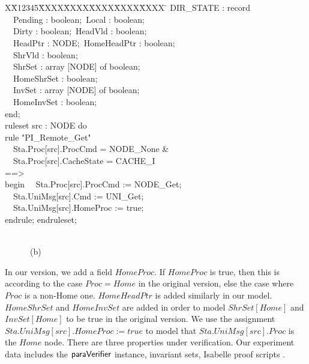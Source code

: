 \documentclass{llncs}
\newlength{\fminilength}
\newenvironment{fmini}[1][\linewidth]
  {\setlength{\fminilength}{#1\fboxsep-2\fboxrule}%
   \vspace{2ex}\noindent\begin{lrbox}{\fminibox}\begin{minipage}{\fminilength}%
   \mbox{ }\hfill\vspace{-2.5ex}}%
  {\end{minipage}\end{lrbox}\vspace{1ex}\hspace{0ex}%
   \framebox{\usebox{\fminibox}}}
\newenvironment{specification}
{\noindent\scriptsize
\tt\begin{fmini}\begin{tabbing}X\=X12345\=XXXX\=XXXX\=XXXX\=XXXX\=XXXX
\=\+\kill} {\end{tabbing}\normalfont\end{fmini}}
\def \twoSpaces {\ \ }
\def \twoSpaces {\ \ }
\begin{document}
{\begin{multicols}{2}
\begin{specification}
  DIR\_STATE : record\\
\twoSpaces     Pending : boolean;\     Local : boolean;\\
\twoSpaces     Dirty : boolean;\      HeadVld : boolean;\\
\twoSpaces     HeadPtr : NODE;\      HomeHeadPtr : boolean;\\
\twoSpaces     ShrVld : boolean;\\
\twoSpaces     ShrSet : array [NODE] of boolean;\\
\twoSpaces     HomeShrSet : boolean;\\
\twoSpaces     InvSet : array [NODE] of boolean;\\
\twoSpaces     HomeInvSet : boolean;\\
  end;\\

  ruleset src : NODE do\\
rule "PI\_Remote\_Get"\\
\twoSpaces   Sta.Proc[src].ProcCmd = NODE\_None \&\\
\twoSpaces   Sta.Proc[src].CacheState = CACHE\_I\\
==>\\
begin
\twoSpaces   Sta.Proc[src].ProcCmd := NODE\_Get;\\
\twoSpaces   Sta.UniMsg[src].Cmd := UNI\_Get;\\
\twoSpaces   Sta.UniMsg[src].HomeProc := true;\\
endrule; endruleset;
\end{specification}\\
\twoSpaces \twoSpaces \twoSpaces \center(b)
\end{multicols}
}



In our version, we add a field $HomeProc$. If $HomeProc$ is true, then this is according to the case $Proc=Home$ in the original version, else     the case where $Proc$ is a non-Home one. $HomeHeadPtr$ is added similarly in our model.  $HomeShrSet$  and     $HomeInvSet$ are added in order to model $ShrSet[Home]$ and $InvSet[Home]$ to be true in the original version. We use the assignment $Sta.UniMsg[src].HomeProc := true$ to  model   that $Sta.UniMsg[src].Proc$ is the $Home$ node. There are three properties under verification. Our experiment data includes the
${\sf paraVerifier}$ instance, invariant sets, Isabelle proof
scripts \cite{LiCache16a}.
\end{document}
